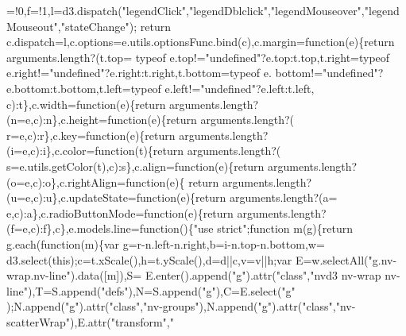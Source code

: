 \begin{DoxyCode}
{      =!0,f=!1,l=d3.dispatch(\textcolor{stringliteral}{"legendClick"},\textcolor{stringliteral}{"legendDblclick"},\textcolor{stringliteral}{"legendMouseover"},\textcolor{stringliteral}{"legendMouseout"},\textcolor{stringliteral}{"stateChange"});\textcolor{keywordflow}{
      return} c.dispatch=l,c.options=e.utils.optionsFunc.bind(c),c.margin=\textcolor{keyword}{function}(e)\{\textcolor{keywordflow}{return} arguments.length?(t.top=
      typeof e.top!=\textcolor{stringliteral}{"undefined"}?e.top:t.top,t.right=typeof e.right!=\textcolor{stringliteral}{"undefined"}?e.right:t.right,t.bottom=typeof e.
      bottom!=\textcolor{stringliteral}{"undefined"}?e.bottom:t.bottom,t.left=typeof e.left!=\textcolor{stringliteral}{"undefined"}?e.left:t.left,
      c):t\},c.width=\textcolor{keyword}{function}(e)\{\textcolor{keywordflow}{return} arguments.length?(n=e,c):n\},c.height=\textcolor{keyword}{function}(e)\{\textcolor{keywordflow}{return} arguments.length?(
      r=e,c):r\},c.key=\textcolor{keyword}{function}(e)\{\textcolor{keywordflow}{return} arguments.length?(i=e,c):i\},c.color=\textcolor{keyword}{function}(t)\{\textcolor{keywordflow}{return} arguments.length?(
      s=e.utils.getColor(t),c):s\},c.align=\textcolor{keyword}{function}(e)\{\textcolor{keywordflow}{return} arguments.length?(o=e,c):o\},c.rightAlign=\textcolor{keyword}{function}(e)\{\textcolor{keywordflow}{
      return} arguments.length?(u=e,c):u\},c.updateState=\textcolor{keyword}{function}(e)\{\textcolor{keywordflow}{return} arguments.length?(a=
      e,c):a\},c.radioButtonMode=\textcolor{keyword}{function}(e)\{\textcolor{keywordflow}{return} arguments.length?(f=e,c):f\},c\},e.models.line=\textcolor{keyword}{function}()\{\textcolor{stringliteral}{"use
       strict"};\textcolor{keyword}{function} m(g)\{\textcolor{keywordflow}{return} g.each(\textcolor{keyword}{function}(m)\{var g=r-n.left-n.right,b=i-n.top-n.bottom,w=
      d3.select(\textcolor{keyword}{this});c=t.xScale(),h=t.yScale(),d=d||c,v=v||h;var E=w.selectAll(\textcolor{stringliteral}{"g.nv-wrap.nv-line"}).data([m]),S=
      E.enter().append(\textcolor{stringliteral}{"g"}).attr(\textcolor{stringliteral}{"class"},\textcolor{stringliteral}{"nvd3 nv-wrap nv-line"}),T=S.append(\textcolor{stringliteral}{"defs"}),N=S.append(\textcolor{stringliteral}{"g"}),C=E.select(\textcolor{stringliteral}{"g"}
      );N.append(\textcolor{stringliteral}{"g"}).attr(\textcolor{stringliteral}{"class"},\textcolor{stringliteral}{"nv-groups"}),N.append(\textcolor{stringliteral}{"g"}).attr(\textcolor{stringliteral}{"class"},\textcolor{stringliteral}{"nv-scatterWrap"}),E.attr(\textcolor{stringliteral}{"transform"},\textcolor{stringliteral}{"
}}
\end{DoxyCode}
